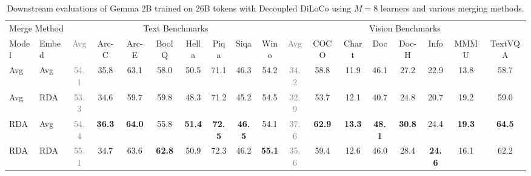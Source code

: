 \documentclass[11pt, a4paper, twocolumn, copyright, google]{google}
\begin{document}
\begin{table}[t]
    \centering
    \footnotesize
    \setlength{\tabcolsep}{2.5pt}
    \begin{tabular}{ll cccccccc cccccccc}
        \toprule
        \multicolumn{2}{c}{Merge Method} & \multicolumn{8}{c}{Text Benchmarks} & \multicolumn{8}{c}{Vision Benchmarks} \\
        \cmidrule(lr){1-2} \cmidrule(lr){3-10} \cmidrule(lr){11-18}
        Model & Embed & \textcolor{gray}{\scriptsize Avg} & Arc-C & Arc-E & BoolQ & Hella & Piqa & Siqa & Wino & \textcolor{gray}{\scriptsize Avg} & COCO & Chart & Doc & Doc-H & Info & MMMU & TextVQA \\
        \midrule
        Avg           & Avg           & \textcolor{gray}{\scriptsize 54.1} & 35.8          & 63.1          & 58.0          & 50.5          & 71.1          & 46.3          & 54.2          & \textcolor{gray}{\scriptsize 34.2} & 58.8          & 11.9          & 46.1          & 27.2          & 22.9          & 13.8          & 58.7          \\
        Avg           & RDA           & \textcolor{gray}{\scriptsize 53.3} & 34.6          & 59.7          & 59.8          & 48.3          & 71.2          & 45.2          & 54.5          & \textcolor{gray}{\scriptsize 32.9} & 53.7          & 12.1          & 40.7          & 24.8          & 20.7          & 19.2          & 59.0          \\
        RDA           & Avg           & \textcolor{gray}{\scriptsize 54.4} & \textbf{36.3} & \textbf{64.0} & 55.8          & \textbf{51.4} & \textbf{72.5} & \textbf{46.5} & 54.1          & \textcolor{gray}{\scriptsize 37.6} & \textbf{62.9} & \textbf{13.3} & \textbf{48.1} & \textbf{30.8} & 24.4          & \textbf{19.3} & \textbf{64.5} \\
        RDA           & RDA           & \textcolor{gray}{\scriptsize 55.1} & 34.7          & 63.6          & \textbf{62.8} & 50.9          & 72.3          & 46.2          & \textbf{55.1} & \textcolor{gray}{\scriptsize 35.6} & 59.4          & 12.6          & 46.0          & 28.4          & \textbf{24.6} & 16.1          & 62.2          \\
        \bottomrule
    \end{tabular}
    \caption{Downstream evaluations of Gemma 2B trained on 26B tokens with Decoupled DiLoCo using $M = 8$ learners and various merging methods.}
    \label{tab:merging_ablation_m_8}
\end{table}
\end{document}
